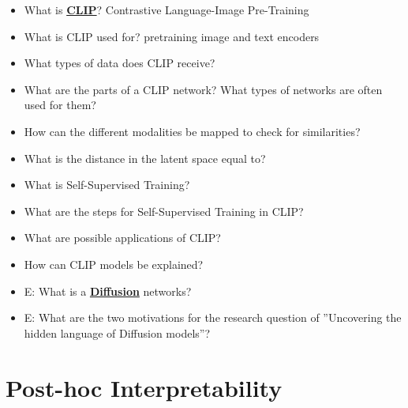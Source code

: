 \documentclass{report}
\begin{document}
\begin{itemize}
		\item What is \textbf{\underline{CLIP}}?
		\newline Contrastive Language-Image Pre-Training
		\item What is CLIP used for?
		\newline pretraining image and text encoders
		\item What types of data does CLIP receive?
		\newline 
		\item What are the parts of a CLIP network? What types of networks are often used for them?
		\newline 
		\item How can the different modalities be mapped to check for similarities?
		\newline 
		\item What is the distance in the latent space equal to?
		\newline 
		\item What is Self-Supervised Training?
		\newline 
		\item What are the steps for Self-Supervised Training in CLIP?
		\newline 
		\item What are possible applications of CLIP?
		\newline 
		\item How can CLIP models be explained?
		\newline 
		
		\item E: What is a \textbf{\underline{Diffusion}} networks?
		\newline 
		\item E: What are the two motivations for the research question of ”Uncovering the hidden language of Diffusion models”?
		\newline 
		
	\end{itemize}

	\section{Post-hoc Interpretability}
	
\end{document}
